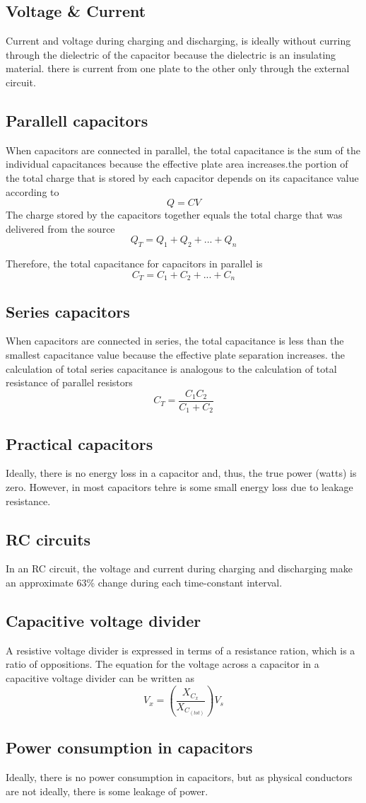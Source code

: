 \subsection{Voltage \& Current}
Current and voltage during charging and discharging, is ideally without curring through the dielectric of the capacitor because the dielectric is an insulating material. there is current from one plate to the other only through the external circuit.

\subsection{Parallell capacitors}
When capacitors are connected in parallel, the total capacitance is the sum of the individual capacitances because the effective plate area increases.the portion of the total charge that is stored by each capacitor depends on its capacitance value according to 
\[Q =CV\]
The charge stored by the capacitors together equals the total charge that was delivered from the source 
\[Q_T = Q_1 + Q_2 + ... + Q_n\]

Therefore, the total capacitance for capacitors in parallel is 
\[C_T = C_1 + C_2 + ... + C_n\]

\subsection{Series capacitors}
When capacitors are connected in series, the total capacitance is less than the smallest capacitance value because the effective plate separation increases. the calculation of total series capacitance is analogous to the calculation of total resistance of parallel resistors 
\[C_T = \frac{C_1 C_2}{C_1 + C_2}\]

\subsection{Practical capacitors}
Ideally, there is no energy loss in a capacitor and, thus, the true power (watts) is zero. However, in most capacitors tehre is some small energy loss due to leakage resistance.

\subsection{RC circuits}
In an RC circuit, the voltage and current during charging and discharging make an approximate 63\% change during each time-constant interval. 

\subsection{Capacitive voltage divider}
A resistive voltage divider is expressed in terms of a resistance ration, which is a ratio of oppositions. The equation for the voltage across a capacitor in a capacitive voltage divider can be written as 
\[V_x = \left(\frac{X_C_x}{X_C_{(tot)}}\right) V_s\]

\subsection{Power consumption in capacitors}
Ideally, there is no power consumption in capacitors, but as physical conductors are not ideally, there is some leakage of power.
